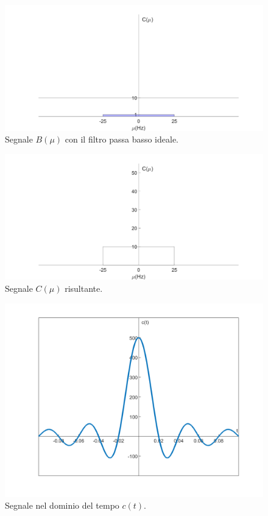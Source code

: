 \documentclass[a4paper]{article}
\begin{document}
	\begin{figure}[!htp]
		\centering
		\includegraphics[width=\textwidth]{img/segnale_B-con-filtro.PNG}
		\caption*{Segnale $B\left(\mu\right)$ con il filtro passa basso ideale.}
	\end{figure}
	
	\begin{figure}[!htp]
		\centering
		\includegraphics[width=\textwidth]{img/segnale_C.PNG}
		\caption*{Segnale $C\left(\mu\right)$ risultante.}
	\end{figure}\newpage
	
	\begin{figure}[!htp]
		\centering
		\includegraphics[width=\textwidth]{img/segnale_c-tempo.PNG}
		\caption*{Segnale nel dominio del tempo $c\left(t\right)$.}
	\end{figure}\newpage
	
\end{document}
